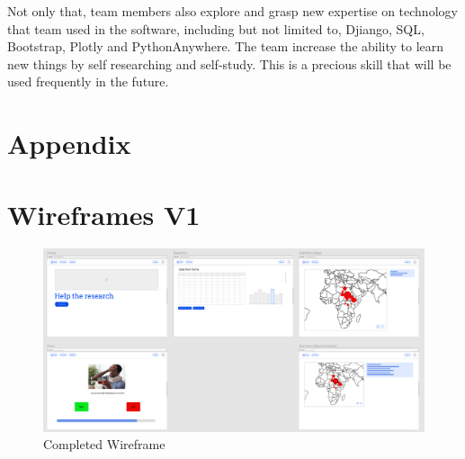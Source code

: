 \documentclass{l3proj}
\begin{document}
Not only that, team members also explore and grasp new expertise on technology that team used in the software, including but not limited to, Djiango, SQL, Bootstrap, Plotly and PythonAnywhere. The team increase the ability to learn new things by self researching and self-study. This is a precious skill that will be used frequently in the future.





\newpage

\section{Appendix}
\label{appendix}

\appendix
\section{Wireframes V1}
\label{wireframes}

\begin{figure}[H]
  \centering
    \includegraphics[width=1\textwidth]{images/Whole.png}
  \caption{Completed Wireframe}
  \label{fig:WholeV1}
\end{figure}
\end{document}
